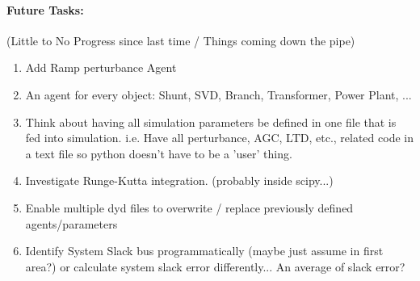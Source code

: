 \documentclass[12pt]{article}
\begin{document}
\paragraph{Future Tasks:}(Little to No Progress since last time / Things coming down the pipe)
	\begin{enumerate}
		\item Add Ramp perturbance Agent
		
		\item An agent for every object: Shunt, SVD, Branch, Transformer, Power Plant, ...
		
		\item Think about having all simulation parameters be defined in one file that is fed into simulation. i.e. Have all perturbance, AGC, LTD, etc., related code in a text file so python doesn't have to be a 'user' thing.
		
		\item Investigate Runge-Kutta integration. (probably inside scipy...)
		
		\item Enable multiple dyd files to overwrite / replace previously defined agents/parameters
		
		\item Identify System Slack bus programmatically (maybe just assume in first area?)
		\subitem or calculate system slack error differently... An average of slack error?
		
		
	\end{enumerate}
\end{document}
